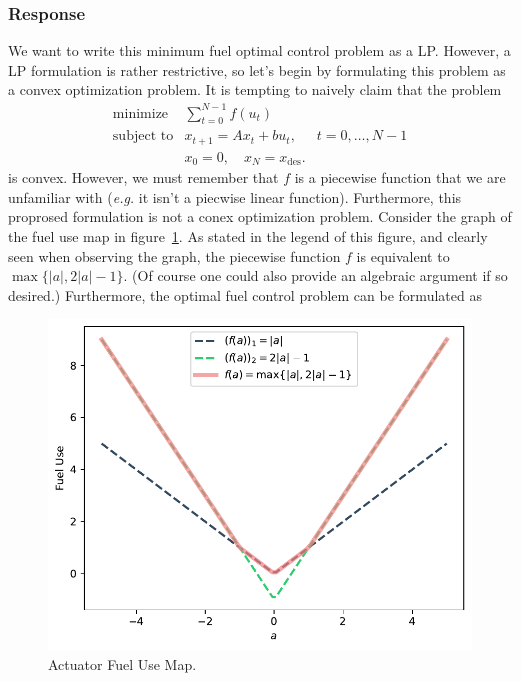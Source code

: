 \documentclass[12pt,reqno]{article}
\theoremstyle{definition}
\numberwithin{equation}{section}
\begin{document}
\subsubsection*{Response}
    We want to write this minimum
    fuel optimal control problem as a LP. However, a LP formulation is rather restrictive,
    so let's begin by formulating this problem as a convex optimization problem. It is tempting
    to naively claim that the problem
   \[\begin{array}{lll}
   \text{minimize} \; & \sum_{t=0}^{N-1} f(u_t) & \\
   \text{subject to} & x_{t+1} = Ax_t + bu_t, \; & t=0, \ldots, N-1 \\
   & x_0 = 0, \quad x_{N} = x_{\text{des}}.
   \end{array}\]
   is convex. However, we must remember that $f$ is a piecewise function that we are unfamiliar with (\textit{e.g.}
   it isn't a piecwise linear function). Furthermore, this proprosed formulation is not a conex optimization
   problem. Consider the graph of the fuel use map in figure~\ref{fig:fuel-map}. As stated in the legend of this figure,
   and clearly seen when observing the graph,
   the piecewise function $f$ is equivalent to $\max\{\left| a \right|, 2 \left| a \right| - 1\}$.
   (Of course one could also provide an algebraic argument if so desired.) Furthermore, 
   the optimal fuel control problem can be formulated as

   \begin{figure}[h]
       \centering
       \includegraphics[width=\linewidth]{../examples/364a/cvx-ch4/actuator_fuel-use.pdf}
       \caption{Actuator Fuel Use Map.}
       \label{fig:fuel-map}
   \end{figure}
\end{document}
